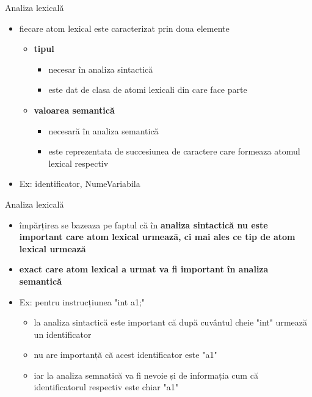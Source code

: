 \documentclass[pdf]{beamer}
\begin{document}
\begin{frame}{Analiza lexicală}
\begin{itemize}
\item
fiecare atom lexical este caracterizat prin doua elemente
\begin{itemize}
\item
\textbf{tipul}

\begin{itemize}
\item
necesar în analiza sintactică

\item
este dat de clasa de atomi lexicali din care face parte
\end{itemize}


\item
\textbf{valoarea semantică}
\begin{itemize}
\item
necesară în analiza semantică

\item
este reprezentata de succesiunea de caractere care formeaza atomul lexical respectiv
\end{itemize}
\end{itemize}

\item
Ex: identificator, NumeVariabila
\end{itemize}
\end{frame}



\begin{frame}{Analiza lexicală}
\begin{itemize}
\item
împărțirea se bazeaza pe faptul că în \textbf{analiza sintactică nu este important care atom lexical urmează, ci mai ales ce tip de atom lexical urmează}

\item
\textbf{exact care atom lexical a urmat va fi important în analiza semantică}

\item
Ex: pentru instrucțiunea "int a1;"
\begin{itemize}
\item
la analiza sintactică este important că după cuvântul cheie "int" urmează un identificator
\item
nu are importanță că acest identificator este "a1"
\item
iar la analiza semnatică va fi nevoie și de informația cum că identificatorul respectiv este chiar "a1"
\end{itemize}
\end{itemize}
\end{frame}
\end{document}
